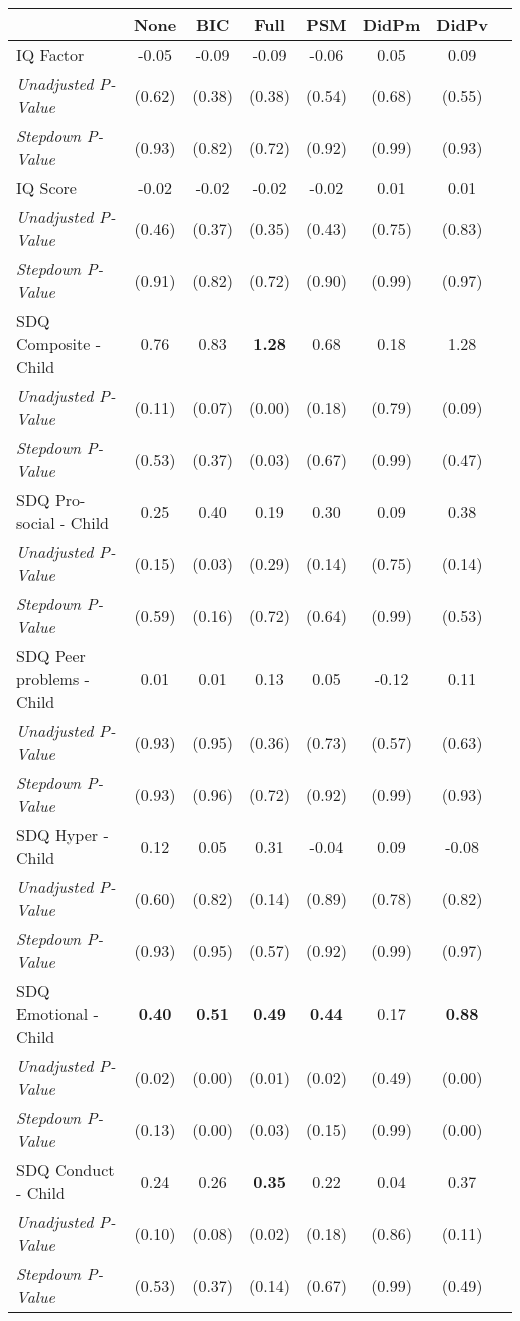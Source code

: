 \begin{tabular}{l c c c c c c c}
\toprule
 & None & BIC & Full & PSM & DidPm & DidPv \\
\midrule
IQ Factor & -0.05 & -0.09 & -0.09 & -0.06 & 0.05 & 0.09 \\
\quad \textit{Unadjusted P-Value} & (0.62) & (0.38) & (0.38) & (0.54) & (0.68) & (0.55) \\
\quad \textit{Stepdown P-Value} & (0.93) & (0.82) & (0.72) & (0.92) & (0.99) & (0.93) \\
IQ Score & -0.02 & -0.02 & -0.02 & -0.02 & 0.01 & 0.01 \\
\quad \textit{Unadjusted P-Value} & (0.46) & (0.37) & (0.35) & (0.43) & (0.75) & (0.83) \\
\quad \textit{Stepdown P-Value} & (0.91) & (0.82) & (0.72) & (0.90) & (0.99) & (0.97) \\
SDQ Composite - Child & 0.76 & 0.83 & \textbf{ 1.28 } & 0.68 & 0.18 & 1.28 \\
\quad \textit{Unadjusted P-Value} & (0.11) & (0.07) & (0.00) & (0.18) & (0.79) & (0.09) \\
\quad \textit{Stepdown P-Value} & (0.53) & (0.37) & (0.03) & (0.67) & (0.99) & (0.47) \\
SDQ Pro-social - Child & 0.25 & 0.40 & 0.19 & 0.30 & 0.09 & 0.38 \\
\quad \textit{Unadjusted P-Value} & (0.15) & (0.03) & (0.29) & (0.14) & (0.75) & (0.14) \\
\quad \textit{Stepdown P-Value} & (0.59) & (0.16) & (0.72) & (0.64) & (0.99) & (0.53) \\
SDQ Peer problems - Child & 0.01 & 0.01 & 0.13 & 0.05 & -0.12 & 0.11 \\
\quad \textit{Unadjusted P-Value} & (0.93) & (0.95) & (0.36) & (0.73) & (0.57) & (0.63) \\
\quad \textit{Stepdown P-Value} & (0.93) & (0.96) & (0.72) & (0.92) & (0.99) & (0.93) \\
SDQ Hyper - Child & 0.12 & 0.05 & 0.31 & -0.04 & 0.09 & -0.08 \\
\quad \textit{Unadjusted P-Value} & (0.60) & (0.82) & (0.14) & (0.89) & (0.78) & (0.82) \\
\quad \textit{Stepdown P-Value} & (0.93) & (0.95) & (0.57) & (0.92) & (0.99) & (0.97) \\
SDQ Emotional - Child & \textbf{ 0.40 } & \textbf{ 0.51 } & \textbf{ 0.49 } & \textbf{ 0.44 } & 0.17 & \textbf{ 0.88 } \\
\quad \textit{Unadjusted P-Value} & (0.02) & (0.00) & (0.01) & (0.02) & (0.49) & (0.00) \\
\quad \textit{Stepdown P-Value} & (0.13) & (0.00) & (0.03) & (0.15) & (0.99) & (0.00) \\
SDQ Conduct - Child & 0.24 & 0.26 & \textbf{ 0.35 } & 0.22 & 0.04 & 0.37 \\
\quad \textit{Unadjusted P-Value} & (0.10) & (0.08) & (0.02) & (0.18) & (0.86) & (0.11) \\
\quad \textit{Stepdown P-Value} & (0.53) & (0.37) & (0.14) & (0.67) & (0.99) & (0.49) \\
\bottomrule
\end{tabular}
